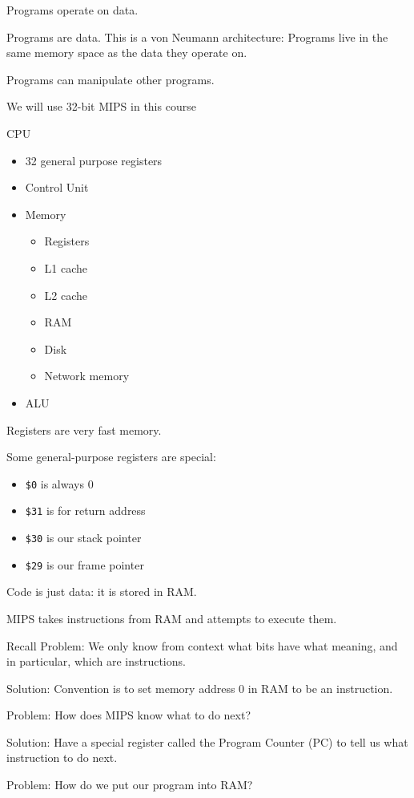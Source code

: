 \documentclass{article}
\begin{document}
Programs operate on data.

Programs are data. This is a von Neumann architecture: Programs live in
the same memory space as the data they operate on.

Programs can manipulate other programs.

We will use 32-bit MIPS in this course

CPU
\begin{itemize}
\item 32 general purpose registers 
\item Control Unit
\item Memory
\begin{itemize}
    \item Registers
    \item L1 cache
    \item L2 cache
    \item RAM
    \item Disk
    \item Network memory
\end{itemize}

\item ALU
\end{itemize}

Registers are very fast memory.

Some general-purpose registers are special:
\begin{itemize}
\item \texttt{\$0} is always
\(0\)
\item \texttt{\$31} is for return address
\item \texttt{\$30} is our stack
pointer
\item \texttt{\$29} is our frame pointer
\end{itemize}

Code is just data: it is stored in RAM.

MIPS takes instructions from RAM and attempts to execute them.

Recall Problem: We only know from context what bits have what meaning,
and in particular, which are instructions.

Solution: Convention is to set memory address \(0\) in RAM to be an
instruction.

\qn{} { Problem: How does MIPS know what to do next?}

Solution: Have a special register called the Program Counter (PC) to
tell us what instruction to do next.

\qn{} { Problem: How do we put our program into RAM?}
\end{document}
